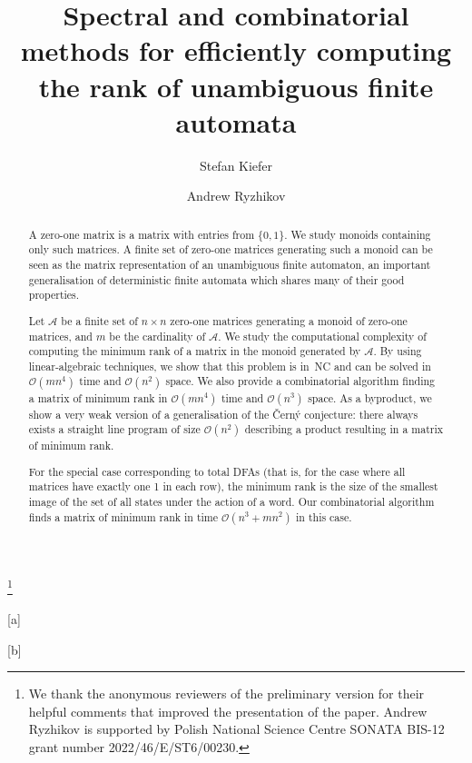 \documentclass[UKenglish]{lmcs}
\newcommand{\OO}{\mathcal{O}}
\newcommand{\Aa}{\mathcal{A}}
\newcommand{\NC}{\textnormal{\textsf{NC}}\xspace}
\begin{document}
\title[The minimum rank of unambiguous finite automata]{Spectral and combinatorial methods for efficiently computing the rank of unambiguous finite automata}

\thanks{We thank the anonymous reviewers of the preliminary version for their helpful comments that improved the presentation of the paper. Andrew Ryzhikov is supported by Polish National Science Centre SONATA BIS-12 grant
number 2022/46/E/ST6/00230.}

\author[S.~Kiefer]{Stefan Kiefer}[a]

\author[A.~Ryzhikov]{Andrew Ryzhikov}[b]

\address{Department of Computer Science, University of Oxford, UK}

\address{University of Warsaw, Warsaw, Poland}	


\begin{abstract}
A zero-one matrix is a matrix with entries from $\{0, 1\}$. We study monoids containing only such matrices. A finite set of zero-one matrices generating such a monoid can be seen as the matrix representation of an unambiguous finite automaton, an important generalisation of deterministic finite automata which shares many of their good properties.

Let $\Aa$ be a finite set of $n \times n$ zero-one matrices generating a monoid of zero-one matrices, and $m$ be the cardinality of $\Aa$.
We study the computational complexity of computing the minimum rank of a matrix in the monoid generated by $\Aa$. By using linear-algebraic techniques, we show that this problem is in~\NC and can be solved in $\OO(mn^4)$ time and $\OO(n^2)$ space. We also provide a combinatorial algorithm finding a matrix of minimum rank in $\OO(mn^4)$ time and $\OO(n^3)$ space. As a byproduct, we show a very weak version of a generalisation of the \v{C}ern\'{y} conjecture: there always exists a straight line program of size $\OO(n^2)$ describing a product resulting in a matrix of minimum rank.

For the special case corresponding to total DFAs (that is, for the case where all matrices have exactly one 1 in each row), the minimum rank is the size of the smallest image of the set of all states under the action of a word. Our combinatorial algorithm finds a matrix of minimum rank in time $\OO(n^3 + mn^2)$ in this case.
\end{abstract}
\end{document}
